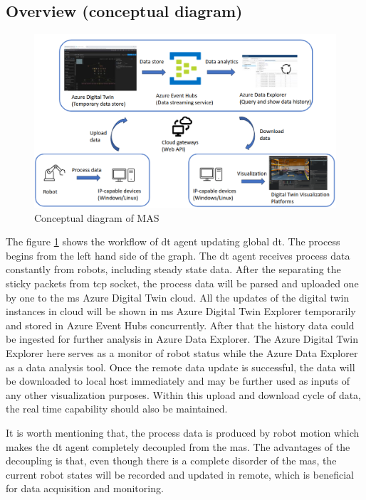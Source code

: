 \subsection{Overview (conceptual diagram)}

\begin{figure}[htb]
\includegraphics[width=\textwidth]{figures/DT_Conceptual_Diagram.png}

\centering
\caption{Conceptual diagram of MAS\label{fig: DTConceptual}}
\end{figure}

The figure \ref{fig: DTConceptual} shows the workflow of \gls{dt} agent updating global \gls{dt}.
The process begins from the left hand side of the graph. The \gls{dt} agent receives process data constantly from robots, including steady state data. 
After the separating the sticky packets from \gls{tcp} socket, the process data will be parsed and uploaded one by one to the \gls{ms} Azure Digital Twin cloud. 
All the updates of the digital twin instances in cloud will be shown in \gls{ms} Azure Digital Twin Explorer temporarily and stored in Azure Event Hubs concurrently. 
After that the history data could be ingested for further analysis in Azure Data Explorer. 
The Azure Digital Twin Explorer here serves as a monitor of robot status while the Azure Data Explorer as a data analysis tool. 
Once the remote data update is successful, the data will be downloaded to local host immediately and may be further used as inputs of any other visualization purposes. 
Within this upload and download cycle of data, the real time capability should also be maintained.  



It is worth mentioning that, the process data is produced by robot motion which makes the \gls{dt} agent completely decoupled from the \gls{mas}. 
The advantages of the decoupling is that, even though there is a complete disorder of the \gls{mas}, the current robot states will be recorded and updated in remote, 
which is beneficial for data acquisition and monitoring. 



